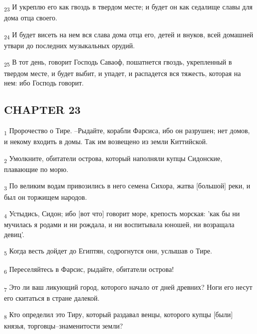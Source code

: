 \begin{tcolorbox}
\textsubscript{23} И укреплю его как гвоздь в твердом месте; и будет он как седалище славы для дома отца своего.
\end{tcolorbox}
\begin{tcolorbox}
\textsubscript{24} И будет висеть на нем вся слава дома отца его, детей и внуков, всей домашней утвари до последних музыкальных орудий.
\end{tcolorbox}
\begin{tcolorbox}
\textsubscript{25} В тот день, говорит Господь Саваоф, пошатнется гвоздь, укрепленный в твердом месте, и будет выбит, и упадет, и распадется вся тяжесть, которая на нем: ибо Господь говорит.
\end{tcolorbox}
\subsection{CHAPTER 23}
\begin{tcolorbox}
\textsubscript{1} Пророчество о Тире. --Рыдайте, корабли Фарсиса, ибо он разрушен; нет домов, и некому входить в домы. Так им возвещено из земли Киттийской.
\end{tcolorbox}
\begin{tcolorbox}
\textsubscript{2} Умолкните, обитатели острова, который наполняли купцы Сидонские, плавающие по морю.
\end{tcolorbox}
\begin{tcolorbox}
\textsubscript{3} По великим водам привозились в него семена Сихора, жатва [большой] реки, и был он торжищем народов.
\end{tcolorbox}
\begin{tcolorbox}
\textsubscript{4} Устыдись, Сидон; ибо [вот что] говорит море, крепость морская: 'как бы ни мучилась я родами и ни рождала, и ни воспитывала юношей, ни возращала девиц'.
\end{tcolorbox}
\begin{tcolorbox}
\textsubscript{5} Когда весть дойдет до Египтян, содрогнутся они, услышав о Тире.
\end{tcolorbox}
\begin{tcolorbox}
\textsubscript{6} Переселяйтесь в Фарсис, рыдайте, обитатели острова!
\end{tcolorbox}
\begin{tcolorbox}
\textsubscript{7} Это ли ваш ликующий город, которого начало от дней древних? Ноги его несут его скитаться в стране далекой.
\end{tcolorbox}
\begin{tcolorbox}
\textsubscript{8} Кто определил это Тиру, который раздавал венцы, которого купцы [были] князья, торговцы--знаменитости земли?
\end{tcolorbox}
